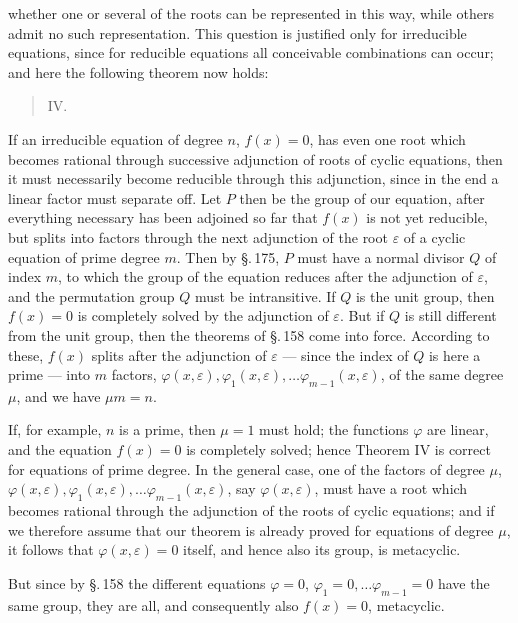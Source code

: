 whether one or several of the roots can be represented in this way,
while others admit no such representation. This question is justified
only for irreducible equations, since for reducible equations all
conceivable combinations can occur; and here the following theorem now holds:

\begin{quote}
\noindent IV.\ 
\end{quote}

If an irreducible equation of degree $n$, $f(x) = 0$, has even
one root which becomes rational through successive adjunction of roots
of cyclic equations, then it must necessarily become reducible
through this adjunction, since in the end a linear
factor must separate off. Let $P$ then be the group
of our equation, after everything necessary has been adjoined so far
that $f(x)$ is not yet reducible, but splits into factors through the next
adjunction of the root $\varepsilon$ of a cyclic equation of prime
degree $m$. Then by \S.\,175, $P$ must have
a normal divisor $Q$ of index $m$, to which the
group of the equation reduces after the adjunction of $\varepsilon$, and the
permutation group $Q$ must be intransitive. If $Q$ is the unit
group, then $f(x) = 0$ is completely solved by the adjunction of $\varepsilon$. But if $Q$ is still different from the unit group, then the theorems of \S.\,158 come into force. According to these,
$f(x)$ splits after the adjunction of $\varepsilon$ — since the index of $Q$ is here a
prime — into $m$ factors, $\varphi(x, \varepsilon), \varphi_1(x, \varepsilon), \ldots \varphi_{m-1}(x, \varepsilon)$, of
the same degree $\mu$, and we have $\mu m = n$.

If, for example, $n$ is a prime, then $\mu = 1$ must hold; the functions $\varphi$ are linear, and the equation $f(x) = 0$ is completely solved; hence Theorem IV is correct for equations of prime degree. In the general case, one of the factors
of degree $\mu$, $\varphi(x, \varepsilon), \varphi_1(x, \varepsilon), \ldots \varphi_{m-1}(x, \varepsilon)$, say $\varphi(x, \varepsilon)$, must have a
root which becomes rational through the adjunction of the roots of cyclic
equations; and if we therefore assume that
our theorem is already proved for equations of degree $\mu$, it
follows that $\varphi(x, \varepsilon) = 0$ itself, and hence also its group, is metacyclic.

But since by \S.\,158 the different equations $\varphi = 0$,
$\varphi_1 = 0, \ldots \varphi_{m-1} = 0$ have the same group, they are all,
and consequently also $f(x) = 0$, metacyclic.
